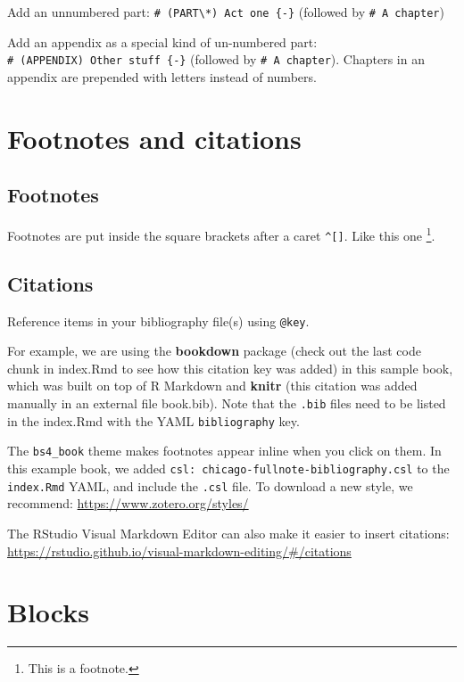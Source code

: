 \documentclass[
  xelatex, ja=standard]{bxjsbook}
\theoremstyle{definition}
\theoremstyle{definition}
\theoremstyle{definition}
\theoremstyle{definition}
\theoremstyle{remark}
\begin{document}
Add an unnumbered part: \texttt{\#\ (PART\textbackslash{}*)\ Act\ one\ \{-\}} (followed by \texttt{\#\ A\ chapter})

Add an appendix as a special kind of un-numbered part: \texttt{\#\ (APPENDIX)\ Other\ stuff\ \{-\}} (followed by \texttt{\#\ A\ chapter}). Chapters in an appendix are prepended with letters instead of numbers.

\hypertarget{footnotes-and-citations}{%
\section{Footnotes and citations}\label{footnotes-and-citations}}

\hypertarget{footnotes}{%
\subsection{Footnotes}\label{footnotes}}

Footnotes are put inside the square brackets after a caret \texttt{\^{}{[}{]}}. Like this one \footnote{This is a footnote.}.

\hypertarget{citations}{%
\subsection{Citations}\label{citations}}

Reference items in your bibliography file(s) using \texttt{@key}.

For example, we are using the \textbf{bookdown} package \citep{R-bookdown} (check out the last code chunk in index.Rmd to see how this citation key was added) in this sample book, which was built on top of R Markdown and \textbf{knitr} \citep{xie2015} (this citation was added manually in an external file book.bib). Note that the \texttt{.bib} files need to be listed in the index.Rmd with the YAML \texttt{bibliography} key.

The \texttt{bs4\_book} theme makes footnotes appear inline when you click on them. In this example book, we added \texttt{csl:\ chicago-fullnote-bibliography.csl} to the \texttt{index.Rmd} YAML, and include the \texttt{.csl} file. To download a new style, we recommend: \url{https://www.zotero.org/styles/}

The RStudio Visual Markdown Editor can also make it easier to insert citations: \url{https://rstudio.github.io/visual-markdown-editing/\#/citations}

\hypertarget{blocks}{%
\section{Blocks}\label{blocks}}
\end{document}
